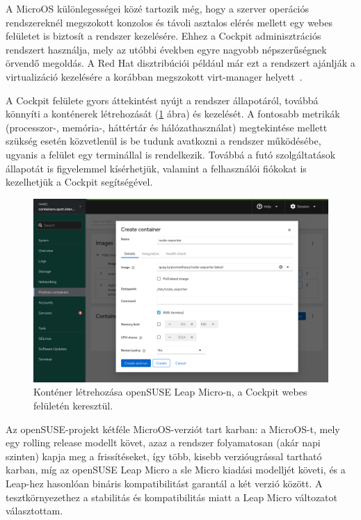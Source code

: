 A MicroOS különlegességei közé tartozik még, hogy a szerver operációs rendszereknél megszokott konzolos és távoli asztalos elérés mellett egy webes felületet is biztosít a rendszer kezelésére. Ehhez a Cockpit adminisztrációs rendszert használja, mely az utóbbi években egyre nagyobb népszerűségnek örvendő megoldás. A Red Hat disztribúciói például már ezt a rendszert ajánlják a virtualizáció kezelésére a korábban megszokott virt-manager helyett~\cite{RHELDeprecated}.

A Cockpit felülete gyors áttekintést nyújt a rendszer állapotáról, továbbá könnyíti a konténerek létrehozását (\ref{fig:cockpit-container} ábra) és kezelését. A fontosabb metrikák (processzor-, memória-, háttértár és hálózathasználat) megtekintése mellett szükség esetén közvetlenül is be tudunk avatkozni a rendszer működésébe, ugyanis a felület egy terminállal is rendelkezik. Továbbá a futó szolgáltatások állapotát is figyelemmel kísérhetjük, valamint a felhasználói fiókokat is kezelhetjük a Cockpit segítségével.

\begin{figure}[ht]
	\centering
	\includegraphics[width=15cm]{figures/cockpit.png}
	\caption{Konténer létrehozása openSUSE Leap Micro-n, a Cockpit webes felületén keresztül.}
	\label{fig:cockpit-container}
\end{figure}

Az openSUSE-projekt kétféle MicroOS-verziót tart karban: a MicroOS-t, mely egy rolling release modellt követ, azaz a rendszer folyamatosan (akár napi szinten) kapja meg a frissítéseket, így több, kisebb verzióugrással tartható karban, míg az openSUSE Leap Micro a \acrlong{sle} Micro kiadási modelljét követi, és a Leap-hez hasonlóan bináris kompatibilitást garantál a két verzió között. A tesztkörnyezethez a stabilitás és kompatibilitás miatt a Leap Micro változatot választottam.

